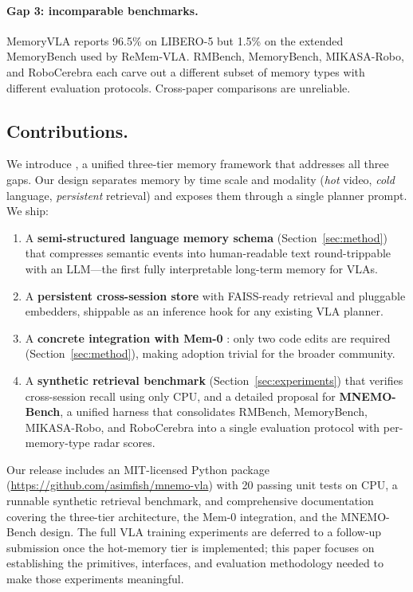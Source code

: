 \paragraph{Gap 3: incomparable benchmarks.}
MemoryVLA reports 96.5\% on LIBERO-5 but 1.5\% on the extended
MemoryBench used by ReMem-VLA. RMBench, MemoryBench, MIKASA-Robo, and
RoboCerebra each carve out a different subset of memory types with
different evaluation protocols. Cross-paper comparisons are
unreliable.

\subsection{Contributions.}
We introduce \method, a unified three-tier memory framework that
addresses all three gaps. Our design separates memory by time scale
and modality (\emph{hot} video, \emph{cold} language, \emph{persistent}
retrieval) and exposes them through a single planner prompt. We ship:

\begin{enumerate}
  \item A \textbf{semi-structured language memory schema}
        (Section~\ref{sec:method}) that compresses semantic events
        into human-readable text round-trippable with an LLM---the
        first fully interpretable long-term memory for VLAs.
  \item A \textbf{persistent cross-session store} with FAISS-ready
        retrieval and pluggable embedders, shippable as an inference
        hook for any existing VLA planner.
  \item A \textbf{concrete integration with Mem-0} \cite{rmbench}:
        only two code edits are required (Section~\ref{sec:method}),
        making adoption trivial for the broader community.
  \item A \textbf{synthetic retrieval benchmark}
        (Section~\ref{sec:experiments}) that verifies cross-session
        recall using only CPU, and a detailed proposal for
        \textbf{MNEMO-Bench}, a unified harness that consolidates
        RMBench, MemoryBench, MIKASA-Robo, and RoboCerebra into a
        single evaluation protocol with per-memory-type radar scores.
\end{enumerate}

Our release includes an MIT-licensed Python package
(\url{https://github.com/asimfish/mnemo-vla}) with 20 passing unit
tests on CPU, a runnable synthetic retrieval benchmark, and
comprehensive documentation covering the three-tier architecture,
the Mem-0 integration, and the MNEMO-Bench design. The full VLA training experiments are deferred to a follow-up
submission once the hot-memory tier is implemented; this paper
focuses on establishing the primitives, interfaces, and evaluation
methodology needed to make those experiments meaningful.
